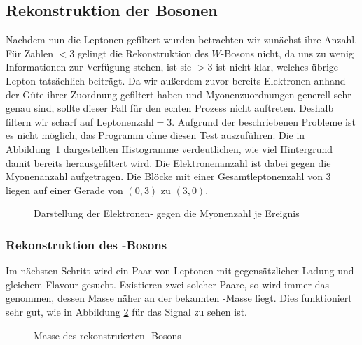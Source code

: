 \subsection{Rekonstruktion der Bosonen}
Nachdem nun die Leptonen gefiltert wurden betrachten wir zunächst ihre Anzahl.
Für Zahlen $< 3$ gelingt die Rekonstruktion des $W$-Bosons nicht, da uns zu
wenig Informationen zur Verfügung stehen, ist sie $> 3$ ist nicht klar, welches
übrige Lepton tatsächlich beiträgt. Da wir außerdem zuvor bereits Elektronen
anhand der Güte ihrer Zuordnung gefiltert haben und Myonenzuordnungen generell
sehr genau sind, sollte dieser Fall für den echten Prozess nicht auftreten.
Deshalb filtern wir scharf auf $\text{Leptonenzahl} = 3$. Aufgrund der
beschriebenen Probleme ist es nicht möglich, das Programm ohne diesen Test
auszuführen. Die in Abbildung~\ref{fig:el_mu_n} dargestellten Histogramme verdeutlichen, wie viel
Hintergrund damit bereits herausgefiltert wird. Die Elektronenanzahl ist dabei
gegen die Myonenanzahl aufgetragen. Die Blöcke mit einer Gesamtleptonenzahl von
3 liegen auf einer Gerade von $(0, 3)$ zu $(3,0)$.

\begin{figure}
  \begin{center}
    
    
  \end{center}
  \begin{center}
    
    
  \end{center}
  \begin{center}
    
  \end{center}
  \caption{Darstellung der Elektronen- gegen die Myonenzahl je Ereignis}
  \label{fig:el_mu_n}
\end{figure}

\subsubsection{Rekonstruktion des \Z-Bosons}
Im nächsten Schritt wird ein Paar von Leptonen mit gegensätzlicher Ladung und
gleichem Flavour gesucht. Existieren zwei solcher Paare, so wird immer das
genommen, dessen Masse näher an der bekannten \Z-Masse liegt. Dies funktioniert
sehr gut, wie in Abbildung \ref{fig:signal_zmasse} für das Signal zu sehen ist.
\begin{figure}
  \begin{center}
    
  \end{center}
  \caption{Masse des rekonstruierten \Z-Bosons}
  \label{fig:signal_zmasse}
\end{figure}

